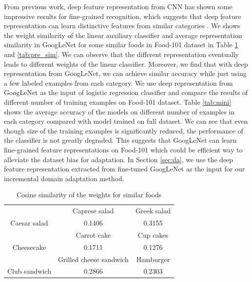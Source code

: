 From previous work, deep feature representation from CNN has shown some impressive results for fine-grained recognition, which suggests that deep feature representation can learn distinctive features from similar categories \cite{zhang2014part} \cite{razavian2014cnn}. We shows the weight similarity of the linear auxiliary classifier and average representation similarity in GoogLeNet for some similar foods in Food-101 dataset in Table \ref{tab:weight_sim} and \ref{tab:pre_sim}. We can observe that the different representation eventually leads to different weights of the linear classifier.
Moreover, we find that with deep representation from GoogLeNet, we can achieve similar accuracy while just using a few labeled examples from each category.
We use deep representation from GoogLeNet as the input of logistic regression classifier and compare the results of different number of training examples on Food-101 dataset.
Table \ref{tab:mini} shows the average accuracy of the models on different number of examples in each category compared with model trained on full dataset. We can see that even though size of the training examples is significantly reduced, the performance of the classifier is not greatly degraded.
This suggests that GoogLeNet can learn fine-grained feature representations on Food-101 which could be efficient way to alleviate the dataset bias for adaptation. In Section \ref{sec:da}, we use the deep feature representation extracted from fine-tuned GoogLeNet as the input for our incremental domain adaptation method.
\begin{table}[htbp]
  \centering
  \caption{Cosine similarity of the weights for similar foods}
    \begin{tabular}{c|c|c}
    \toprule
          & Caprese salad & Greek salad \\
    Caesar salad & 0.1406 & 0.3155 \\
    \toprule
          & Carrot cake & Cup cakes \\
    Cheesecake & 0.1711 & 0.1276 \\
    \toprule
          & Grilled cheese sandwich & Hamburger \\
    Club sandwich & 0.2866 & 0.2303 \\
    \bottomrule
    \end{tabular}%
  \label{tab:weight_sim}%
\end{table}%
